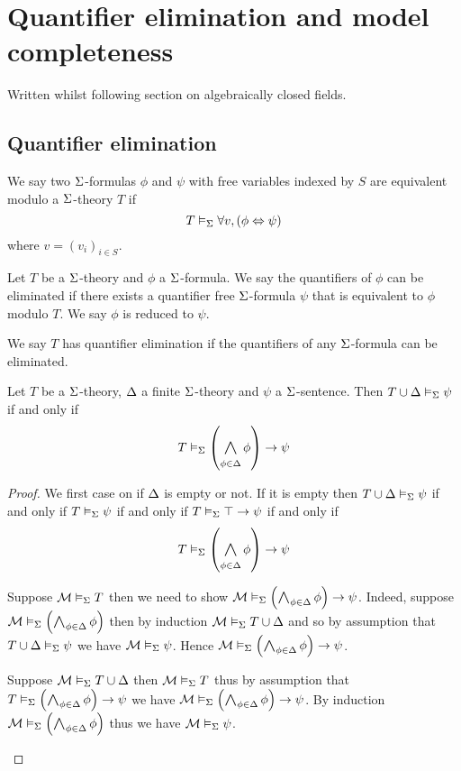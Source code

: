 \section{Quantifier elimination and model completeness}
Written whilst following section on algebraically closed fields.
\subsection{Quantifier elimination}

\begin{dfn}
    We say two $\Sigma$-formulas $\phi$ and $\psi$ with 
    free variables indexed by $S$ are equivalent modulo a 
    $\Sigma$-theory $T$ if 
    \[T \vDash_{\Sigma} \forall v, \left(\phi \Leftrightarrow \psi\right)\]
    where $v = (v_i)_{i \in S}$.
\end{dfn}

\begin{dfn}
    Let $T$ be a $\Sigma$-theory and $\phi$ a $\Sigma$-formula.
    We say the quantifiers of $\phi$ can be eliminated if there exists a
    quantifier free $\Sigma$-formula $\psi$ that is equivalent to $\phi$ 
    modulo $T$.
    We say $\phi$ is reduced to $\psi$.

    We say $T$ has quantifier elimination if the quantifiers of any 
    $\Sigma$-formula can be eliminated.
\end{dfn}

\begin{lem}[Deduction]
    Let $T$ be a $\Sigma$-theory, $\Delta$ a finite $\Sigma$-theory and 
    $\psi$ a $\Sigma$-sentence.
    Then $T \cup \Delta \vDash_{\Sigma} \psi$ if and only if 
    \[T \model{\Si} \brkt{\bigand{\phi \in \De}{} \phi} \to \psi\]
\end{lem}
\begin{proof}
    We first case on if $\Delta$ is empty or not.
    If it is empty then $T \cup \Delta \vDash_{\Sigma} \psi$ if and only if
    $T \vDash_{\Sigma} \psi$ if and only if $T \vDash_{\Sigma} \top \to \psi$
    if and only if 
    \[T \model{\Si} \brkt{\bigand{\phi \in \De}{} \phi} \to \psi\]
    \begin{forward}
        Suppose $\mathcal{M} \vDash_{\Sigma} T$ then we need to show 
        $\MM \model{\Si} \brkt{\bigand{\phi \in \De}{} \phi} \to \psi$. 
        Indeed, suppose $\MM \model{\Si} \brkt{\bigand{\phi \in \De}{} \phi}$ 
        then by induction $\mathcal{M} \vDash_{\Sigma} T \cup \Delta$ and so by assumption
        that $T \cup \Delta \vDash_{\Sigma} \psi$ we have 
        $\mathcal{M} \vDash_{\Sigma} \psi$. 
        Hence $\MM \model{\Si} \brkt{\bigand{\phi \in \De}{} \phi} \to \psi$.
    \end{forward}

    \begin{backward}
        Suppose $\mathcal{M} \vDash_{\Sigma} T \cup \Delta$ then 
        $\mathcal{M} \vDash_{\Sigma} T$ thus by assumption that 
        $T \model{\Si} \brkt{\bigand{\phi \in \De}{} \phi} \to \psi$
        we have $\MM \model{\Si} \brkt{\bigand{\phi \in \De}{} \phi} \to \psi$.
        By induction $\MM \model{\Si} \brkt{\bigand{\phi \in \De}{} \phi}$ 
        thus we have $\mathcal{M} \vDash_{\Sigma} \psi$.
    \end{backward}
\end{proof}

